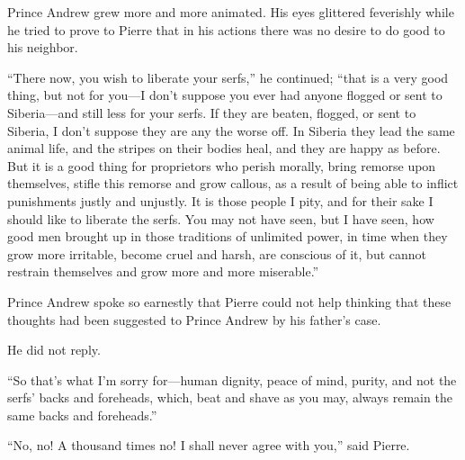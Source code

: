 Prince Andrew grew more and more animated. His eyes glittered
feverishly while he tried to prove to Pierre that in his actions
there was no desire to do good to his neighbor.

``There now, you wish to liberate your serfs,'' he continued;
``that is a very good thing, but not for you---I don't suppose
you ever had anyone flogged or sent to Siberia---and still less
for your serfs. If they are beaten, flogged, or sent to Siberia,
I don't suppose they are any the worse off. In Siberia they lead
the same animal life, and the stripes on their bodies heal, and
they are happy as before. But it is a good thing for proprietors
who perish morally, bring remorse upon themselves, stifle this
remorse and grow callous, as a result of being able to inflict
punishments justly and unjustly. It is those people I pity, and
for their sake I should like to liberate the serfs. You may not
have seen, but I have seen, how good men brought up in those
traditions of unlimited power, in time when they grow more
irritable, become cruel and harsh, are conscious of it, but
cannot restrain themselves and grow more and more miserable.''

Prince Andrew spoke so earnestly that Pierre could not help
thinking that these thoughts had been suggested to Prince Andrew
by his father's case.

He did not reply.

``So that's what I'm sorry for---human dignity, peace of mind,
purity, and not the serfs' backs and foreheads, which, beat and
shave as you may, always remain the same backs and foreheads.''

``No, no! A thousand times no! I shall never agree with you,''
said Pierre.


